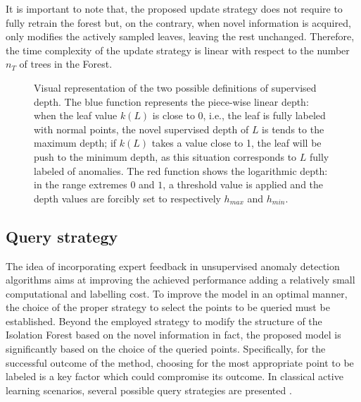 It is important to note that, the proposed update strategy does not require to fully retrain the forest but, on the contrary, when novel information is acquired, \approach only modifies the actively sampled leaves, leaving the rest  unchanged. Therefore, the time complexity of the update strategy is linear with respect to the number $n_T$ of trees in the Forest.




\begin{figure}
\centering

\caption{Visual representation of the two possible definitions of supervised depth. The blue function represents the piece-wise linear depth: when the leaf value $k(L)$ is close to 0, i.e., the leaf is fully labeled with normal points, the novel supervised depth of $L$ is tends to the maximum depth; if $k(L)$ takes a value close to 1, the leaf will be push to the minimum depth, as this situation corresponds to $L$ fully labeled of anomalies. The red function shows the logarithmic depth: in the range extremes $0$ and $1$, a threshold value is applied and the depth values are forcibly set to respectively $h_{max}$ and $h_{min}$.} \label{syngraph}
\end{figure}


\subsection{Query strategy}
The idea of incorporating expert feedback in unsupervised anomaly detection algorithms aims at improving the achieved performance adding a relatively small computational and labelling cost. 
To improve the model in an optimal manner, the choice of the proper strategy to select the points to be queried must be established. 
Beyond the employed strategy to modify the structure of the Isolation Forest based on the novel information in fact, the proposed model is significantly based on the choice of the queried points. Specifically, for the successful outcome of the method, choosing for the most appropriate point to be labeled is a key factor which could compromise its outcome. 
In classical active learning scenarios, several possible query strategies are presented \cite{settles1995active}. 

